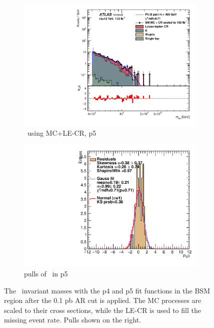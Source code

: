 \begin{figure}[ht]
\begin{subfigure}[h]{0.38\linewidth}
    \includegraphics[scale=0.3]{figs/ch6/fit/variable_nosmooth/p5/01PB/output_SMMCplusCR_Mbe_p5.pdf}%
     \caption{\mbe \ using MC+LE-CR, p5}
     \end{subfigure}
     \hfill
    \begin{subfigure}[h]{0.4\linewidth}
    \includegraphics[scale=0.32]{figs/ch6/fit/variable_nosmooth/p5/01PB/pull_SMMCplusCR_Mbe_p5.pdf}%
    \caption{pulls of \mbe \ in p5}
    \end{subfigure}
    \caption{The \mbe \ invariant masses with the p4 and p5 fit functions in the BSM region after the 0.1 pb AR cut is applied. The MC processes are scaled to their cross sections, while the LE-CR is used to fill the missing event rate. Pulls shown on the right.}
\label{fig:mbe-fit-pulls-01pb}
\end{figure}

